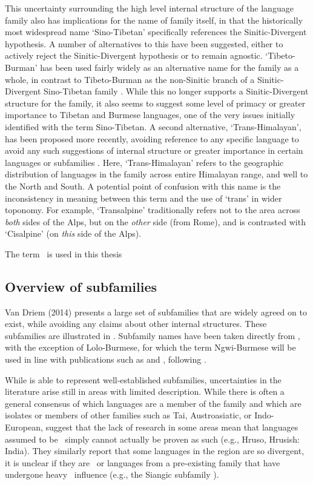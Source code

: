 This uncertainty surrounding the high level internal structure of the language family also has implications for the name of family itself, in that the historically most widespread name `Sino-Tibetan' specifically references the Sinitic-Divergent hypothesis. A number of alternatives to this have been suggested, either to actively reject the Sinitic-Divergent hypothesis or to remain agnostic. `Tibeto-Burman' has been used fairly widely as an alternative name for the family as a whole, in contrast to Tibeto-Burman as the non-Sinitic branch of a Sinitic-Divergent Sino-Tibetan family \cite{vanDriem2007a}. While this no longer supports a Sinitic-Divergent structure for the family, it also seems to suggest some level of primacy or greater importance to Tibetan and Burmese languages, one of the very issues initially identified with the term Sino-Tibetan. A second alternative, `Trans-Himalayan', has been proposed more recently, avoiding reference to any specific language to avoid any such suggestions of internal structure or greater importance in certain languages or subfamilies \cite{BlenchPost2014}. Here, `Trans-Himalayan' refers to the geographic distribution of languages in the family across entire Himalayan range, and well to the North and South. A potential point of confusion with this name is the inconsistency in meaning between this term and the use of `trans' in wider toponomy. For example, `Transalpine' traditionally refers not to the area across \textit{both} sides of the Alps, but on the \textit{other} side (from Rome), and is contrasted with `Cisalpine' (on \textit{this} side of the Alps).

The term \lfam\ is used in this thesis \lfamreason\

\subsection{Overview of subfamilies}\label{ss:THOverview:Subfamilies}

Van Driem (2014) \nocite{VanDriem2014} presents a large set of subfamilies that are widely agreed on to exist, while avoiding any claims about other internal structures. These subfamilies are illustrated in . Subfamily names have been taken directly from , with the exception of Lolo-Burmese, for which the term Ngwi-Burmese will be used in line with publications such as  and , following .

While  is able to represent well-established subfamilies, uncertainties in the literature arise still in areas with limited description. While there is often a general consensus of which languages are a member of the family and which are isolates or members of other families such as Tai, Austroasiatic, or Indo-European,  suggest that the lack of research in some areas mean that languages assumed to be \lfam\ simply cannot actually be proven as such (e.g., Hruso, Hrusish: India). They similarly report that some languages in the region are so divergent, it is unclear if they are \lfam\ or languages from a pre-existing family that have undergone heavy \lfam\ influence (e.g., the Siangic subfamily \cite{Post2011}).

